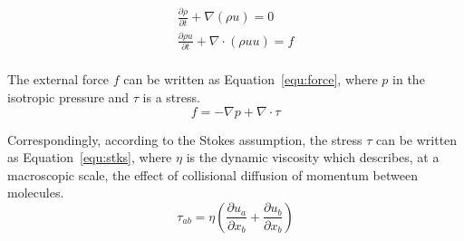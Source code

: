 




\begin{equation}
    \label{equ:conservation}
        \begin{matrix}
        \frac{\partial \rho}{ \partial t} + \nabla (\rho u) = 0 \\
        \frac{\partial{\rho u}}{\partial t} + \nabla \cdot (\rho u u ) = f \\
        \end{matrix}
\end{equation}

The external force $f$ can be written as Equation~\ref{equ:force}, where $p$ in the isotropic pressure and $\tau$ is a stress.
\begin{equation}
    \label{equ:force}
    f = -\nabla p + \nabla \cdot \tau
\end{equation}

Correspondingly, according to the Stokes assumption, the stress $\tau$ can be written as Equation~\ref{equ:stks}, where $\eta$ is the dynamic viscosity which describes, at a macroscopic scale, the effect of collisional diffusion of momentum between molecules. 
\begin{equation}
    \label{equ:stks}
    \tau_{ab} = \eta (\frac{\partial u_a}{ \partial x_b} + \frac{\partial u_b}{\partial x_b})
\end{equation}


